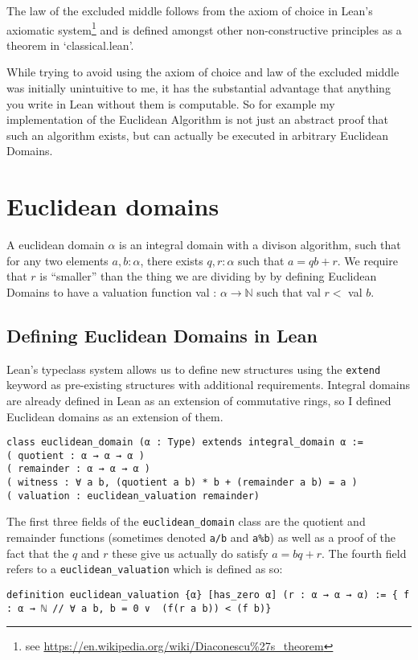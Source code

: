 \documentclass{article}
\newcommand{\N}{\ensuremath{\mathbb{N}}}
\renewcommand{\a}{\alpha}
\newcommand{\ct}{\texttt}
\begin{document}
The law of the excluded middle follows from the axiom of choice in Lean's axiomatic system\footnote{see \url{https://en.wikipedia.org/wiki/Diaconescu\%27s\_theorem}} and is defined amongst other non-constructive principles as a theorem in `classical.lean'. 

While trying to avoid using the axiom of choice and law of the excluded middle was initially unintuitive to me, it has the substantial advantage that anything you write in Lean without them is computable.
So for example my implementation of the Euclidean Algorithm is not just an abstract proof that such an algorithm exists, but can actually be executed in arbitrary Euclidean Domains.

\section{Euclidean domains}
A euclidean domain $\a$ is an integral domain with a divison algorithm, such that for any two elements $a,b :\a$, there exists $q,r : \a$ such that $a=qb+r$.
We require that $r$ is ``smaller'' than the thing we are dividing by by defining Euclidean Domains to have a valuation function val : $\a \to \N$ such that val $r < $ val $b$.

\subsection{Defining Euclidean Domains in Lean}
Lean's typeclass system allows us to define new structures using the \ct{extend} keyword as pre-existing structures with additional requirements.
Integral domains are already defined in Lean as an extension of commutative rings, so I defined Euclidean domains as an extension of them.
\begin{lstlisting}
class euclidean_domain (α : Type) extends integral_domain α :=
( quotient : α → α → α )
( remainder : α → α → α )
( witness : ∀ a b, (quotient a b) * b + (remainder a b) = a )
( valuation : euclidean_valuation remainder)
\end{lstlisting}

The first three fields of the \ct{euclidean\_domain} class are the quotient and remainder functions (sometimes denoted \ct{a/b} and \ct{a\%b}) as well as a proof of the fact that the $q$ and $r$ these give us actually do satisfy $a=bq+r$. The fourth field refers to a \ct{euclidean\_valuation} which is defined as so:
\begin{lstlisting}
definition euclidean_valuation {α} [has_zero α] (r : α → α → α) := { f : α → ℕ // ∀ a b, b = 0 ∨  (f(r a b)) < (f b)}
\end{lstlisting}
\end{document}
